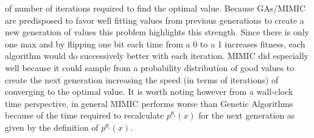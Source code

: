 \documentclass[11pt]{article}
\begin{document}
    of number of iterations required to find the optimal value.
    Because GAs/MIMIC are predisposed to favor well fitting values from previous generations to create a new generation
    of values this problem highlights this strength.
    Since there is only one max and by flipping one bit each time from a 0 to a 1 increases fitness, each algorithm would
    do successively better with each iteration.
    MIMIC did especially well because it could sample from a probability distribution of good values to create the next generation
    increasing the speed (in terms of iterations) of converging to the optimal value.
    It is worth noting however from a wall-clock time perspective, in general MIMIC performs worse than Genetic Algorithms
    because of the time required to recalculate $p^{\theta_i} (x)$ for the next generation as given by the definition of $p^{\theta_i} (x)$.\cite{Isbell97}
\end{document}
